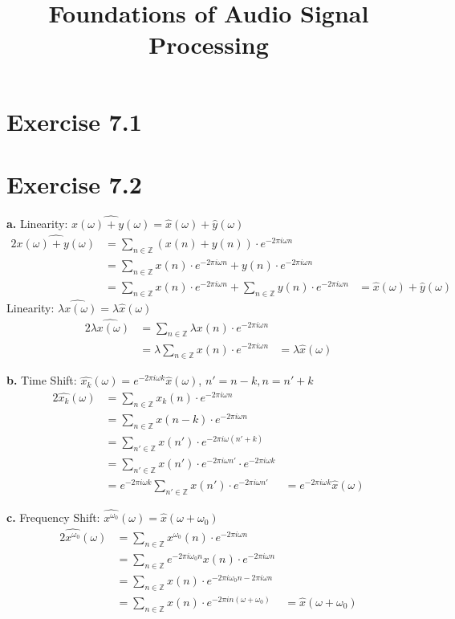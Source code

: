 \documentclass[12pt]{article}
\title{Foundations of Audio Signal Processing\\ \ass}
\author{\auth}
\newcommand{\inte}{\mathbb{Z}}
\newcommand{\eek}{\ensuremath{e^{-2\pi i \omega k}}}
\newcommand{\een}{\ensuremath{e^{-2\pi i \omega n}}}
\begin{document}
	\maketitle
	\section*{Exercise 7.1}
	\section*{Exercise 7.2}
	\textbf{a.} Linearity: $\widehat{x(\omega) + y(\omega)} = \hat{x}(\omega) + \hat{y}(\omega)$
	\begin{alignat*}{2}
		\widehat{x(\omega) + y(\omega)} &= \sum_{n \in \inte} (x(n) + y(n)) \cdot \een\\
		&= \sum_{n \in \inte} x(n) \cdot \een + y(n) \cdot \een\\
		&= \sum_{n \in \inte} x(n) \cdot \een + \sum_{n \in \inte} y(n) \cdot \een
		&= \hat{x}(\omega) + \hat{y}(\omega)
	\end{alignat*}
	Linearity: $\widehat{\lambda x(\omega)} = \lambda\hat{x}(\omega)$
	\begin{alignat*}{2}
		\widehat{\lambda x(\omega)} &= \sum_{n \in \inte} \lambda x(n) \cdot \een\\
		&= \lambda \sum_{n \in \inte} x(n) \cdot \een
		&= \lambda\hat{x}(\omega)
	\end{alignat*}


	\textbf{b.} Time Shift: $\hat{x_k}(\omega) = \eek \hat{x}(\omega)$, $n' = n-k, n= n'+k$
	\begin{alignat*}{2}
		\hat{x_k}(\omega) &= \sum_{n \in \inte} x_k(n) \cdot \een\\
		&= \sum_{n \in \inte} x(n-k) \cdot \een\\
		&= \sum_{n' \in \inte} x(n') \cdot e^{-2\pi i \omega (n'+k)}\\
		&= \sum_{n' \in \inte} x(n') \cdot e^{-2\pi i \omega n'} \cdot e^{-2\pi i \omega k}\\
		&= e^{-2\pi i \omega k} \sum_{n' \in \inte} x(n') \cdot e^{-2\pi i \omega n'} 
		&= \eek \hat{x}(\omega)
	\end{alignat*}


	\textbf{c.} Frequency Shift: $\widehat{x^{\omega_0}}(\omega) = \hat{x}(\omega + \omega_0)$
	\begin{alignat*}{2}
		\widehat{x^{\omega_0}}(\omega) &= \sum_{n \in \inte} x^{\omega_0}(n) \cdot \een\\
		&= \sum_{n \in \inte} e^{-2\pi i \omega_0 n}x(n) \cdot \een\\
		&= \sum_{n \in \inte} x(n) \cdot e^{-2\pi i \omega_0 n - 2\pi i \omega n}\\
		&= \sum_{n \in \inte} x(n) \cdot e^{-2\pi i n (\omega + \omega_0)}
		&= \hat{x}(\omega + \omega_0)
	\end{alignat*}
	
\end{document}
